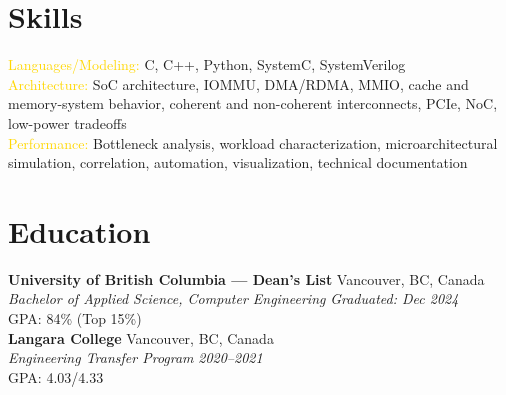 \documentclass[11pt]{article}
\newcommand{\gold}[1]{\textcolor{gold}{#1}}
\newcommand{\resumeSubheading}[4]{%
  \textbf{#1} \hfill #2\\
  \textit{#3} \hfill \textit{#4}\\
}
\begin{document}
\section{Skills}
\gold{Languages/Modeling:} C, C++, Python, SystemC, SystemVerilog\\
\gold{Architecture:} SoC architecture, IOMMU, DMA/RDMA, MMIO, cache and memory-system behavior, coherent and non-coherent interconnects, PCIe, NoC, low-power tradeoffs\\
\gold{Performance:} Bottleneck analysis, workload characterization, microarchitectural simulation, correlation, automation, visualization, technical documentation

\section{Education}
\resumeSubheading{University of British Columbia --- Dean's List}{Vancouver, BC, Canada}{Bachelor of Applied Science, Computer Engineering}{Graduated: Dec 2024}
GPA: 84\% (Top 15\%)\\
\resumeSubheading{Langara College}{Vancouver, BC, Canada}{Engineering Transfer Program}{2020--2021}
GPA: 4.03/4.33
\end{document}
